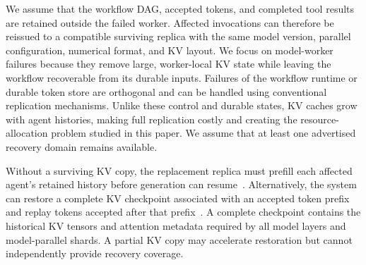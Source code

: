 We assume that the workflow DAG, accepted tokens, and completed tool results are retained outside the failed worker. Affected invocations can therefore be reissued to a compatible surviving replica with the same model version, parallel configuration, numerical format, and KV layout. We focus on model-worker failures because they remove large, worker-local KV state while leaving the workflow recoverable from its durable inputs. Failures of the workflow runtime or durable token store are orthogonal and can be handled using conventional replication mechanisms. Unlike these control and durable states, KV caches grow with agent histories, making full replication costly and creating the resource-allocation problem studied in this paper. We assume that at least one advertised recovery domain remains available. 

Without a surviving KV copy, the replacement replica must prefill each affected agent's retained history before generation can resume~\cite{strati2024dejavu}. Alternatively, the system can restore a complete KV checkpoint associated with an accepted token prefix and replay tokens accepted after that prefix~\cite{strati2024dejavu,cao2026lumen}. A complete checkpoint contains the historical KV tensors and attention metadata required by all model layers and model-parallel shards. A partial KV copy may accelerate restoration but cannot independently provide recovery coverage.
